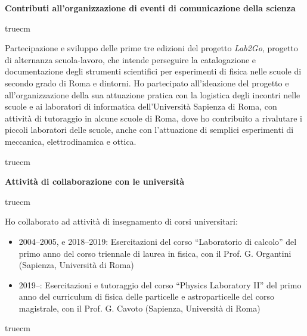 \documentclass[11pt,twoside,a4paper]{article}
\begin{document}
\begin{center}
\textbf{Contributi all’organizzazione di eventi di comunicazione della scienza}
\end{center}
 truecm

Partecipazione e sviluppo delle prime tre edizioni del progetto
\textit{Lab2Go}, progetto di alternanza scuola-lavoro, che intende
perseguire la catalogazione e documentazione degli strumenti
scientifici per esperimenti di fisica nelle scuole di secondo grado di
Roma e dintorni. Ho partecipato all'ideazione del progetto e
all'organizzazione della sua attuazione pratica con la logistica degli
incontri nelle scuole e ai laboratori di informatica dell'Universit\`a
Sapienza di Roma, con attivit\`a di tutoraggio in alcune scuole di
Roma, dove ho contribuito a rivalutare i piccoli laboratori delle
scuole, anche con l'attuazione di semplici esperimenti di meccanica,
elettrodinamica e ottica.

 truecm
\begin{center}
\textbf{Attivit\`a di collaborazione con le universit\`a}
\end{center}
 truecm

Ho collaborato ad attivit\`a di insegnamento di corsi universitari:
\begin{itemize}
\item 2004--2005, e 2018--2019: Esercitazioni del corso ``Laboratorio
  di calcolo'' del primo anno del corso triennale di laurea in fisica,
  con il Prof. G. Organtini (Sapienza, Universit\`a di Roma)
\item 2019--: Esercitazioni e tutoraggio del corso ``Physics
  Laboratory II'' del primo anno del curriculum di fisica delle
  particelle e astroparticelle del corso magistrale, con il
  Prof. G. Cavoto (Sapienza, Universit\`a di Roma)
\end{itemize}
 truecm
\end{document}
